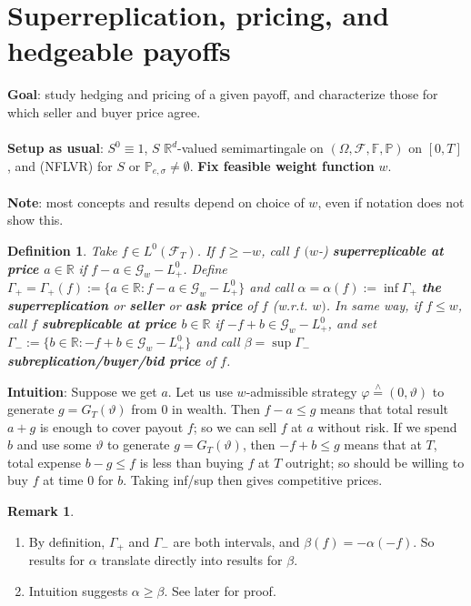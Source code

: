 \documentclass[12pt,a4paper, twoside]{article}
\newtheorem{defn}{Definition}[section]
\theoremstyle{definition}
\newtheorem{rem}{Remark}[section]
\newcommand{\PP}{\mathbb{P}} %
\newcommand{\teq}{\overset{\wedge}{=}}
\begin{document}
\section{Superreplication, pricing, and hedgeable payoffs}
\textbf{Goal}: study hedging and pricing of a given payoff, and characterize those for which seller and buyer price agree. 
\\\\
\textbf{Setup as usual}: $S^0 \equiv 1$, $S$ $\mathbb{R}^d$-valued semimartingale on $( \Omega, \mathcal{F}, \mathbb{F}, \PP)$ on $[0,T]$,  and (NFLVR) for $S$ or $\PP_{e, \sigma} \neq \emptyset$. \textbf{Fix feasible weight function} $w$.
\\\\
\textbf{Note}: most concepts and results depend on choice of $w$, even if notation does not show this. 
\begin{defn} Take $f \in L^0( \mathcal{F}_T)$. If $f \geq -w$, call $f$ $(w$-) \textbf{superreplicable at price $a \in \mathbb{R}$} if $f-a \in \mathcal{G}_w-L_+^0$. Define $\Gamma_+= \Gamma_+(f) := \{ a \in \mathbb{R}: f-a \in \mathcal{G}_w-L_+^0 \}$ and call $\alpha = \alpha(f) := \inf \Gamma_+$ \textbf{the superreplication} or \textbf{seller} or \textbf{ask price} of $f$ (w.r.t. $w)$. In same way, if $f \leq w$, call $f$ \textbf{subreplicable at price $b \in \mathbb{R}$} if $-f + b \in \mathcal{G}_w-L_+^0$, and set $\Gamma_- := \{ b \in \mathbb{R}: -f + b \in \mathcal{G}_w-L_+^0\}$ and call $\beta = \sup \Gamma_-$ \textbf{subreplication/buyer/bid price} of $f$.
\end{defn}
\noindent \textbf{Intuition}: Suppose we get $a$. Let us use $w$-admissible strategy $\varphi \teq (0, \vartheta)$ to generate $g = G_T( \vartheta)$ from $0$ in wealth. Then $f-a \leq g$ means that total result $a+g$ is enough to cover payout $f$; so we can sell $f$ at $a$ without risk. If we spend $b$ and use some $\vartheta$ to generate $g = G_T( \vartheta)$, then $-f+b \leq g$ means that at $T$, total expense $b-g \leq f$ is less than buying $f$ at $T$ outright; so should be willing to buy $f$ at time $0$ for $b$. Taking inf/sup then gives competitive prices. 
\begin{rem} \
\begin{enumerate}
\item By definition, $\Gamma_+$ and $\Gamma_-$ are both intervals, and $\beta(f) = - \alpha(-f)$. So results for $\alpha$ translate directly into results for $\beta$. 
\item Intuition suggests $\alpha \geq \beta$. See later for proof. 
\end{enumerate}
\end{rem}
\end{document}
